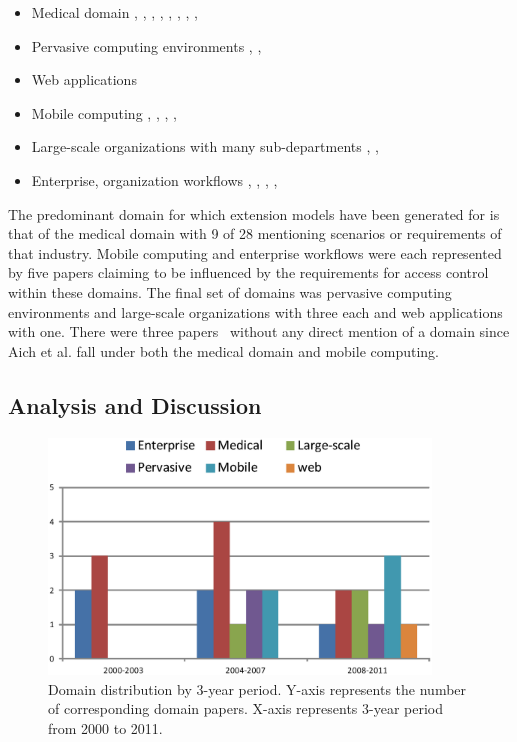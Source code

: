 \begin{itemize}
\setlength{\itemsep}{0.25pt}
\item Medical domain \cite{alam06:constraint}, \cite{tzelepi01:flexible}, \cite{motta03:contextual}, \cite{ni2010privacy}, \cite{damiani2007geo}, \cite{hansen2003spatial}, \cite{samuel07:spatio-temporal}, \cite{aich09:role}, \cite{zhou2007team}
\item Pervasive computing environments \cite{huang06:pervasive}, \cite{chen08:spatio-temporal}, \cite{ray07:spatio}
\item Web applications \cite{masoumzadeh2008purbac}
\item Mobile computing \cite{thein2011leveraging}, \cite{zou2009crbac}, \cite{chandran05:llt}, \cite{ray07:spatio}, \cite{aich09:role}
\item Large-scale organizations with many sub-departments \cite{yamazaki04:designing}, \cite{han08:extended}, \cite{yao2008task}
\item Enterprise, organization workflows \cite{cholewka00:acontext-sensitive}, \cite{bao08:role}, \cite{zhang06:collaborative}, \cite{oh2003task}, \cite{joshi05:generalized}
\end{itemize}

The predominant domain for which extension models have been generated for is that of the medical domain with 9 of 28 mentioning scenarios or requirements of that industry.
Mobile computing and enterprise workflows were each represented by five papers claiming to be influenced by the requirements for access control within these domains. The final set
of domains was pervasive computing environments and large-scale organizations with three each and web applications with one.  There were three papers~\cite{jian2008extended, aich07:STARBAC, haibo2005context} without any direct mention of a domain since Aich et al. \cite{aich09:role} fall under both the medical domain and mobile computing.

\subsection{Analysis and Discussion}

\begin{figure}[ht]
    \centering
        \includegraphics[width=4.0in]{sections/dist_domains_byYear.eps}
\vspace{-0.2 in}
    \caption{\label{fig:dist_domains}Domain distribution by 3-year period. Y-axis represents the number of corresponding domain papers.
    X-axis represents 3-year period from 2000 to 2011.}
\end{figure}



